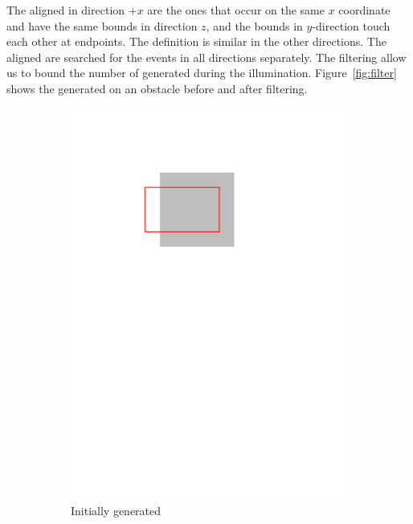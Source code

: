 \documentclass[english,gradu]{tktltiki2018}
\begin{document}
The aligned \addEs in direction $+x$ are the ones that occur on the same $x$ coordinate and have the same bounds in direction $z$, and the bounds in $y$-direction touch each other at endpoints.
The definition is similar in the other directions.
The aligned \addEs are searched for the events in all directions separately.
The filtering allow us to bound the number of \addEs generated during the illumination.
Figure~\ref{fig:filter} shows the generated \addEs on an obstacle before and after filtering.

\begin{figure}\centering
	\begin{subfigure}[t]{0.3\textwidth}\centering
		\includegraphics[width=\textwidth,page=2]{fig/filter}
		\caption{Initially generated \addEs}
	\end{subfigure}
	\hfil
	\begin{subfigure}[t]{0.3\textwidth}\centering

\end{subfigure}
\end{figure}
\end{document}
